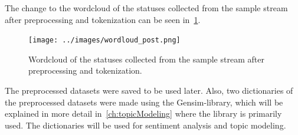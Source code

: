 The change to the wordcloud of the statuses collected from the sample stream after preprocessing and tokenization can be seen in~\ref{fig:wordloud_post}.

\begin{figure}
    \centering
    \caption{Wordcloud of the statuses collected from the sample stream after preprocessing and tokenization.}
    \label{fig:wordloud_post}
    \texttt{[image: ../images/wordloud\_post.png]}
\end{figure}

The preprocessed datasets were saved to be used later.
Also, two dictionaries of the preprocessed datasets were made using the Gensim-library,
which will be explained in more detail in~\ref{ch:topicModeling} where the library is primarily used.
The dictionaries will be used for sentiment analysis and topic modeling.
